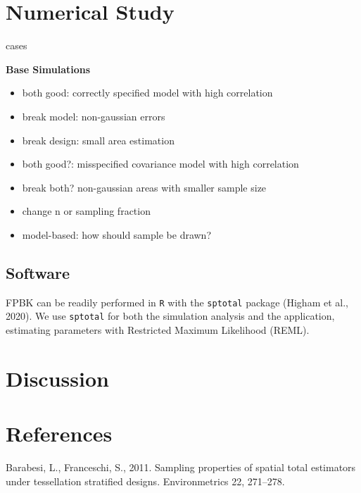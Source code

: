 \documentclass[]{elsarticle} %
\begin{document}
\hypertarget{numerical-study}{%
\section{Numerical Study}\label{numerical-study}}

cases

\textbf{Base Simulations}

\begin{itemize}
\item
  both good: correctly specified model with high correlation
\item
  break model: non-gaussian errors
\item
  break design: small area estimation
\item
  both good?: misspecified covariance model with high correlation
\item
  break both? non-gaussian areas with smaller sample size
\item
  change n or sampling fraction
\item
  model-based: how should sample be drawn?
\end{itemize}

\hypertarget{software}{%
\subsection{Software}\label{software}}

FPBK can be readily performed in \texttt{R} with the \texttt{sptotal}
package (Higham et al., 2020). We use \texttt{sptotal} for both the
simulation analysis and the application, estimating parameters with
Restricted Maximum Likelihood (REML).

\hypertarget{discussion}{%
\section{Discussion}\label{discussion}}

\hypertarget{references}{%
\section*{References}\label{references}}

\hypertarget{refs}{}
\leavevmode\hypertarget{ref-barabesi2011sampling}{}%
Barabesi, L., Franceschi, S., 2011. Sampling properties of spatial total
estimators under tessellation stratified designs. Environmetrics 22,
271--278.
\end{document}
